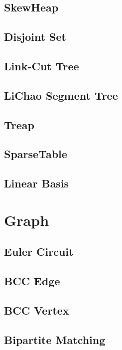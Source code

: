 \documentclass[a4paper,10pt,twocolumn,oneside]{article}
\begin{document}
\subsection{SkewHeap}

\subsection{Disjoint Set}

\subsection{Link-Cut Tree}

\subsection{LiChao Segment Tree}

\subsection{Treap}

\subsection{SparseTable}

\subsection{Linear Basis}


\section{Graph}
\subsection{Euler Circuit}

\subsection{BCC Edge}

\subsection{BCC Vertex}

\subsection{Bipartite Matching}

\end{document}

